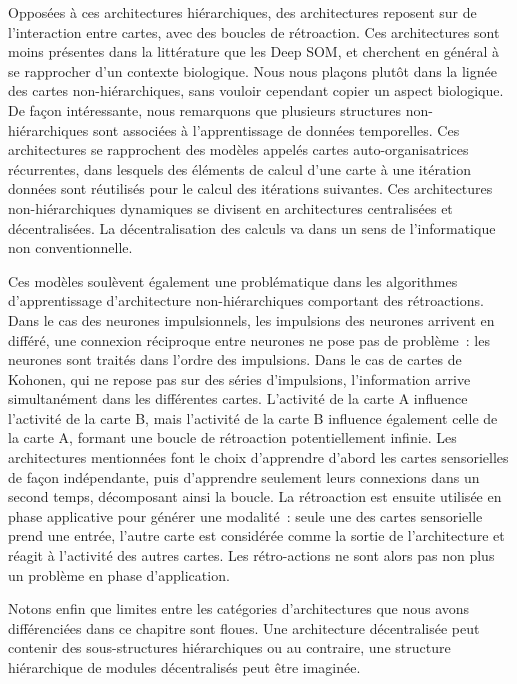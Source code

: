 \documentclass[../main]{subfiles}
\begin{document}
Opposées à ces architectures hiérarchiques, des architectures reposent sur de l'interaction entre cartes, avec des boucles de rétroaction.
Ces architectures sont moins présentes dans la littérature que les Deep SOM, et cherchent en général à se rapprocher d'un contexte biologique.
Nous nous plaçons plutôt dans la lignée des cartes non-hiérarchiques, sans vouloir cependant copier un aspect biologique.
De façon intéressante, nous remarquons que plusieurs structures non-hiérarchiques sont associées à l'apprentissage de données temporelles. Ces architectures se rapprochent des modèles appelés cartes auto-organisatrices récurrentes, dans lesquels des éléments de calcul d'une carte à une itération données sont réutilisés pour le calcul des itérations suivantes.
Ces architectures non-hiérarchiques dynamiques se divisent en architectures centralisées et décentralisées. La décentralisation des calculs va dans un sens de l'informatique non conventionnelle.

Ces modèles soulèvent également une problématique dans les algorithmes d'apprentissage d'architecture non-hiérarchiques comportant des rétroactions. Dans le cas des neurones impulsionnels, les impulsions des neurones arrivent en différé, une connexion réciproque entre neurones ne pose pas de problème~: les neurones sont traités dans l'ordre des impulsions. Dans le cas de cartes de Kohonen, qui ne repose pas sur des séries d'impulsions, l'information arrive simultanément dans les différentes cartes. L'activité de la carte A influence l'activité de la carte B, mais l'activité de la carte B influence également celle de la carte A, formant une boucle de rétroaction potentiellement infinie. Les architectures mentionnées font le choix d'apprendre d'abord les cartes sensorielles de façon indépendante, puis d'apprendre seulement leurs connexions dans un second temps, décomposant ainsi la boucle. 
La rétroaction est ensuite utilisée en phase applicative pour générer une modalité~: seule une des cartes sensorielle prend une entrée, l'autre carte est considérée comme la sortie de l'architecture et réagit à l'activité des autres cartes. Les rétro-actions ne sont alors pas non plus un problème en phase d'application.

Notons enfin que limites entre les catégories d'architectures que nous avons différenciées dans ce chapitre sont floues. Une architecture décentralisée peut contenir des sous-structures hiérarchiques ou au contraire, une structure hiérarchique de modules décentralisés peut être imaginée.
\end{document}
